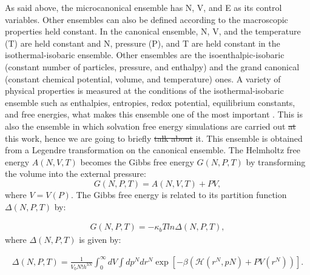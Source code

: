 \documentclass[
	12pt,				%
	openany,			%
	oneside,			%
	a4paper,			%
	english,			%
	brazil				%
	]{abntex2}
\providecommand{\DIFadd}[1]{{\protect\color{blue}\uwave{#1}}}
\providecommand{\DIFdel}[1]{{\protect\color{red}\sout{#1}}}
\providecommand{\DIFaddbegin}{}
\providecommand{\DIFaddend}{}
\providecommand{\DIFdelbegin}{}
\providecommand{\DIFdelend}{}
\providecommand{\DIFadd}[1]{{\protect\color{blue}\uwave{#1}}} %
\providecommand{\DIFdel}[1]{{\protect\color{red}\sout{#1}}}                      %
\providecommand{\DIFaddbegin}{} %
\providecommand{\DIFaddend}{} %
\providecommand{\DIFdelbegin}{} %
\providecommand{\DIFdelend}{} %
\begin{document}
As said above, the microcanonical ensemble  has  N, V, and E as its control variables. Other ensembles can also be defined according to the macroscopic properties held constant.  In the canonical ensemble,  N, V, and the temperature (T) are held constant and  N, pressure (P), and T are held constant in the isothermal-isobaric ensemble. Other ensembles are the isoenthalpic-isobaric (constant number of particles, pressure, and enthalpy) and the grand canonical (constant chemical potential, volume, and temperature) ones. A variety of physical properties is measured at the conditions of the isothermal-isobaric ensemble such as enthalpies, entropies, redox potential, equilibrium constants, and free energies, what makes this ensemble one of the most important \cite{tuckerman}. This is also the ensemble in which solvation free energy simulations are carried out \DIFdelbegin \DIFdel{at }\DIFdelend \DIFaddbegin \DIFadd{in }\DIFaddend this work, hence we are going to briefly \DIFdelbegin \DIFdel{talk about }\DIFdelend \DIFaddbegin \DIFadd{describe }\DIFaddend it. This ensemble is obtained from a Legendre transformation on the canonical ensemble. The Helmholtz free energy $A(N,V,T)$ becomes the Gibbs free energy $G(N,P,T)$ by transforming the volume into the external pressure:
\begin{equation}
G(N,P,T) = A(N,V,T) + PV,
\DIFaddbegin \label{eq:gcm}
\DIFaddend \end{equation}
where $V = V(P)$. The Gibbs free energy is related to its partition function $\Delta (N,P,T)$ by:

\begin{equation}
\label{eq:fisobari}
\begin{aligned}
G(N,P,T) = -\kappa_{b}T ln \Delta (N,P,T),
\end{aligned}
\end{equation}
where $\Delta (N,P,T)$ is given by: 

\begin{equation}
\DIFdelbegin %
\DIFdelend \DIFaddbegin \begin{aligned}
\Delta (N,P,T) = \frac{1}{V_{0}N!h^{3N}} \int_{0}^{\infty} dV \int d p^{N} d r^{N} \exp \left[ -\beta \left( \mathcal{H} (r^{N},p{N}) + PV(r^{N}) \right) \right] .
\end{aligned}
\DIFaddend \end{equation}
\end{document}
